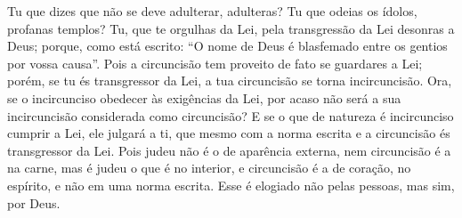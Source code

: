 {Tu que dizes que não se deve adulterar, adulteras? Tu que odeias os ídolos, profanas
 templos?
Tu, que te orgulhas da Lei, pela transgressão da Lei desonras a Deus;
porque, como está escrito: “O nome de Deus é blasfemado entre os gentios por vossa causa”.
{}
Pois a circuncisão tem proveito de fato se guardares a Lei; porém, se tu és transgressor da Lei, a tua circuncisão se torna incircuncisão.
Ora, se o incircunciso obedecer às exigências da Lei, por acaso não será a sua incircuncisão considerada como circuncisão?
E se o que de natureza é incircunciso cumprir a Lei, ele julgará a ti, que mesmo com a norma escrita
 e a circuncisão és transgressor da Lei.
Pois judeu não é o de aparência externa, nem circuncisão é a na carne,
mas é judeu o que é no interior, e circuncisão é a de coração, no espírito,
 e não em uma norma escrita.
 Esse é elogiado não pelas pessoas, mas sim, por Deus.

}
